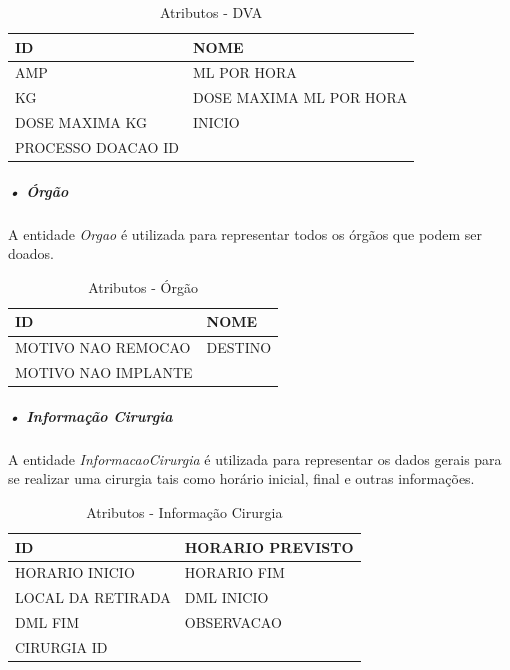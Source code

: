 \documentclass[portuguese,oneside]{tcc}
\begin{document}
\begin{table}
\centering
\caption{Atributos - DVA} \label{table:atr-dva}
\begin{tabular}{ |p{6cm}|p{6cm}| }

\hline
ID & NOME\\
\hline
AMP & ML POR HORA\\
\hline
KG & DOSE MAXIMA ML POR HORA\\
\hline
DOSE MAXIMA KG & INICIO\\
\hline
PROCESSO DOACAO ID &\\

\hline

\end{tabular}
\end{table}

\subparagraph{• Órgão}
A entidade \textit{Orgao} é utilizada para representar todos os órgãos que podem ser doados.

\begin{table}
\centering
\caption{Atributos - Órgão} \label{table:atr-orgao}
\begin{tabular}{ |p{6cm}|p{6cm}| }

\hline
ID & NOME\\
\hline
MOTIVO NAO REMOCAO & DESTINO\\
\hline
MOTIVO NAO IMPLANTE & \\

\hline

\end{tabular}
\end{table}

\subparagraph{• Informação Cirurgia}
A entidade \textit{InformacaoCirurgia} é utilizada para representar os dados gerais para se realizar uma cirurgia tais como horário inicial, final e outras informações.

\begin{table}
\centering
\caption{Atributos - Informação Cirurgia} \label{table:informacao-cirurgia}
\begin{tabular}{ |p{6cm}|p{6cm}| }

\hline
ID & HORARIO PREVISTO\\
\hline
HORARIO INICIO & HORARIO FIM\\
\hline
LOCAL DA RETIRADA & DML INICIO\\
\hline
DML FIM & OBSERVACAO\\

\hline
CIRURGIA ID & \\
\hline

\end{tabular}
\end{table}
\end{document}
